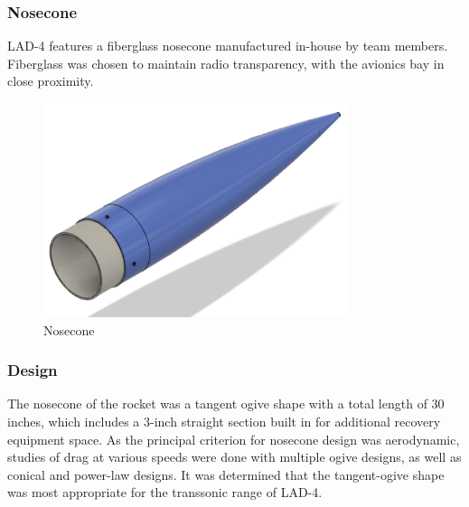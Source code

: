 \subsubsection{Nosecone}
LAD-4 features a fiberglass nosecone manufactured in-house by team members. Fiberglass was chosen to maintain radio transparency, with the avionics bay in close proximity.
\begin{figure}[H]
	\centering
	\includegraphics[width=3.5in]{imgs/nosecone.png}
	\caption{Nosecone}
	\label{fig:nosecone}
\end{figure}
\subsubsection*{Design}
The nosecone of the rocket was a tangent ogive shape with a total length of 30 inches, which includes a 3-inch straight section built in for additional recovery equipment space. As the principal criterion for nosecone design was aerodynamic, studies of drag at various speeds were done with multiple ogive designs, as well as conical and power-law designs. It was determined that the tangent-ogive shape was most appropriate for the transsonic range of LAD-4.
